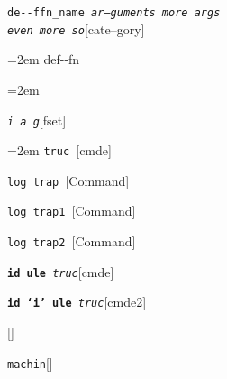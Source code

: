 \documentclass{book}
\begin{document}
\endgroup{}%
\noindent\texttt{de{-}{-}ffn\_name \EmbracOn{}\textnormal{\textsl{ar--guments    more args \leavevmode{}\\ even more so}}\EmbracOff{}}\hfill[cate--gory]



%
\par\begingroup\obeylines\obeyspaces\frenchspacing\leftskip=2em\relax\parskip=0pt\relax\ttfamily{}%
def{-}{-}fn
\endgroup{}%
\par\begingroup\obeylines\obeyspaces\frenchspacing\leftskip=2em\relax\parskip=0pt\relax\ttfamily{}%

\endgroup{}%
\noindent\texttt{\textsl{i} \EmbracOn{}\textnormal{\textsl{a g}}\EmbracOff{}}\hfill[fset]



%
\par\begingroup\obeylines\obeyspaces\frenchspacing\leftskip=2em\relax\parskip=0pt\relax\ttfamily{}%
%
\endgroup{}%
\noindent\texttt{truc \EmbracOn{}\textnormal{\textsl{}}\EmbracOff{}}\hfill[cmde]



%
\noindent\texttt{log trap \EmbracOn{}\textnormal{\textsl{}}\EmbracOff{}}\hfill[Command]



%
\noindent\texttt{log trap1 \EmbracOn{}\textnormal{\textsl{}}\EmbracOff{}}\hfill[Command]



%
\noindent\texttt{log trap2 \EmbracOn{}\textnormal{\textsl{}}\EmbracOff{}}\hfill[Command]



%
\noindent\texttt{\textbf{id ule} \EmbracOn{}\textnormal{\textsl{truc}}\EmbracOff{}}\hfill[cmde]



%
\noindent\texttt{\textbf{id `\texttt{i}' ule} \EmbracOn{}\textnormal{\textsl{truc}}\EmbracOff{}}\hfill[cmde2]



%
\noindent\texttt{}\hfill[]



\noindent\texttt{machin}\hfill[]
\end{document}
